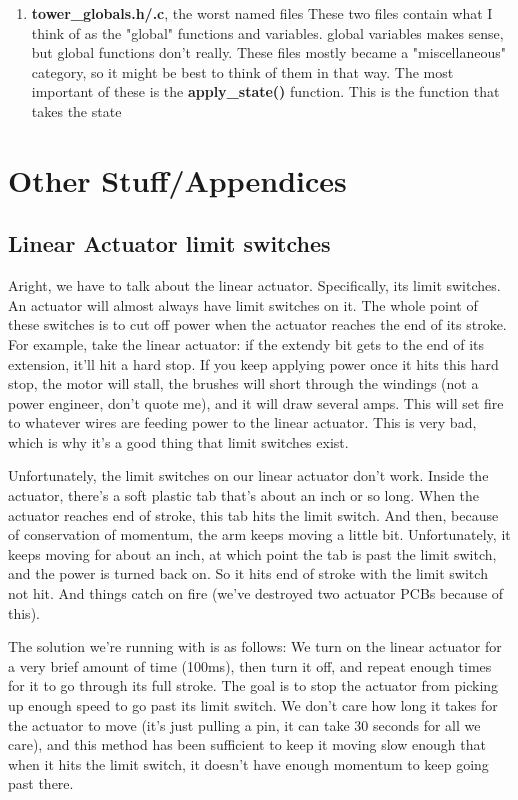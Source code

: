 \documentclass[11pt]{article}
\begin{document}
\begin{enumerate}
\item \textbf{tower\_globals.h/.c}, the worst named files
\label{sec:org4183310}
These two files contain what I think of as the "global" functions and
variables. global variables makes sense, but global functions don't
really. These files mostly became a "miscellaneous" category, so it might be
best to think of them in that way. The most important of these is the
\textbf{apply\_state()} function. This is the function that takes the state
\end{enumerate}

\section{Other Stuff/Appendices}
\label{sec:org10323e3}

\subsection{Linear Actuator limit switches}
\label{sec:org411c3e4}
\label{sec:linear_act_lsw}

Aright, we have to talk about the linear actuator. Specifically, its limit
switches. An actuator will almost always have limit switches on it. The
whole point of these switches is to cut off power when the actuator reaches
the end of its stroke. For example, take the linear actuator: if the
extendy bit gets to the end of its extension, it'll hit a hard stop. If you
keep applying power once it hits this hard stop, the motor will stall, the
brushes will short through the windings (not a power engineer, don't quote
me), and it will draw several amps. This will set fire to whatever wires
are feeding power to the linear actuator. This is very bad, which is why
it's a good thing that limit switches exist.

Unfortunately, the limit switches on our linear actuator don't
work. Inside the actuator, there's a soft plastic tab that's about an inch
or so long. When the actuator reaches end of stroke, this tab hits the
limit switch. And then, because of conservation of momentum, the arm keeps
moving a little bit. Unfortunately, it keeps moving for about an inch, at
which point the tab is past the limit switch, and the power is turned back
on. So it hits end of stroke with the limit switch not hit. And things
catch on fire (we've destroyed two actuator PCBs because of this).

The solution we're running with is as follows: We turn on the linear
actuator for a very brief amount of time (100ms), then turn it off, and
repeat enough times for it to go through its full stroke. The goal is to
stop the actuator from picking up enough speed to go past its limit
switch. We don't care how long it takes for the actuator to move (it's just
pulling a pin, it can take 30 seconds for all we care), and this method has
been sufficient to keep it moving slow enough that when it hits the limit
switch, it doesn't have enough momentum to keep going past there.
\end{document}
